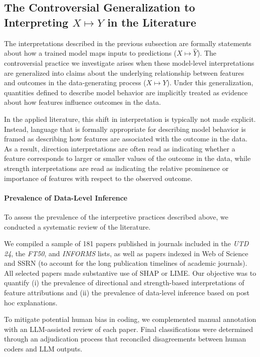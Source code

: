 \documentclass[11pt]{article}
\begin{document}
\subsection{The Controversial Generalization to Interpreting $X \mapsto Y$ in the Literature}
The interpretations described in the previous subsection are formally statements about how a trained model maps inputs to predictions ($X \mapsto \hat{Y}$). The controversial practice we investigate arises when these model-level interpretations are generalized into claims about the underlying relationship between features and outcomes in the data-generating process ($X \mapsto Y$). Under this generalization, quantities defined to describe model behavior are implicitly treated as evidence about how features influence outcomes in the data.

In the applied literature, this shift in interpretation is typically not made explicit. Instead, language that is formally appropriate for describing model behavior is framed as describing how features are associated with the outcome in the data. As a result, direction interpretations are often read as indicating whether a feature corresponds to larger or smaller values of the outcome in the data, while strength interpretations are read as indicating the relative prominence or importance of features with respect to the observed outcome.

\paragraph{Prevalence of Data-Level Inference}

To assess the prevalence of the interpretive practices described above, we conducted a systematic review of the literature.

We compiled a sample of 181 papers published in journals included in the \textit{UTD 24}, the \textit{FT50}, and \textit{INFORMS} lists, as well as papers indexed in Web of Science and SSRN (to account for the long publication timelines of academic journals). All selected papers made substantive use of SHAP or LIME. Our objective was to quantify (i) the prevalence of directional and strength-based interpretations of feature attributions and (ii) the prevalence of data-level inference based on post hoc explanations.

To mitigate potential human bias in coding, we complemented manual annotation with an LLM-assisted review of each paper. Final classifications were determined through an adjudication process that reconciled disagreements between human coders and LLM outputs. %
\end{document}
